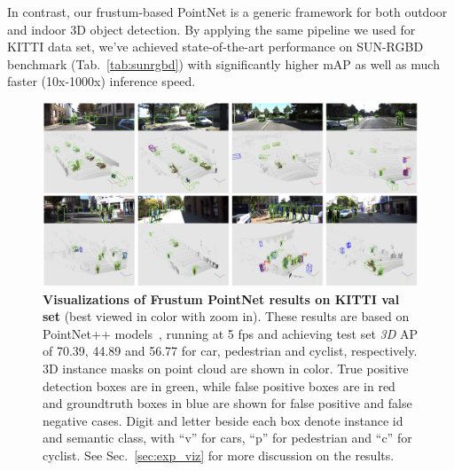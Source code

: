 In contrast, our frustum-based PointNet is a generic framework for both outdoor and indoor 3D object detection. By applying the same pipeline we used for KITTI data set, we've achieved state-of-the-art performance on SUN-RGBD benchmark (Tab.~\ref{tab:sunrgbd}) with significantly higher mAP as well as much faster (10x-1000x) inference speed.




\begin{figure}[t!]
    \centering
    \includegraphics[width=\linewidth]{fig/results.jpg}
    \caption{\textbf{Visualizations of Frustum PointNet results on KITTI val set}  (best viewed in color with zoom in). These results are based on PointNet++ models~\cite{qi2017pointnetplusplus}, running at 5 fps and achieving test set \emph{3D} AP of 70.39, 44.89 and 56.77 for car, pedestrian and cyclist, respectively. 3D instance masks on point cloud are shown in color. True positive detection boxes are in green, while false positive boxes are in red and groundtruth boxes in blue are shown for false positive and false negative cases. Digit and letter beside each box denote instance id and semantic class, with ``v'' for cars, ``p'' for pedestrian and ``c'' for cyclist. See Sec.~\ref{sec:exp_viz} for more discussion on the results.}
    \label{fig:results}
\end{figure}

